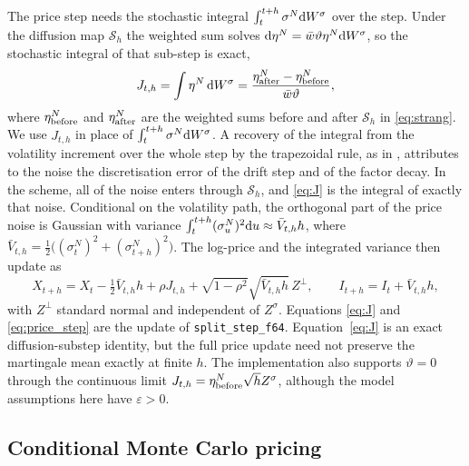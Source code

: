 The price step needs the stochastic integral $\int_t^{t+h}\sigma^N\mathrm{d} W^\sigma$ over the step. Under the diffusion map $\mathcal{S}_h$ the weighted sum solves $\mathrm{d}\eta^N=\bar w\vartheta\eta^N\mathrm{d} W^\sigma$, so the stochastic integral of that sub-step is exact,
\begin{equation}\label{eq:J}
J_{t,h}=\int\eta^N\,\D W^\sigma=\frac{\eta^N_{\rm after}-\eta^N_{\rm before}}{\bar w\vartheta},
\end{equation}
where $\eta^N_{\rm before}$ and $\eta^N_{\rm after}$ are the weighted sums before and after $\mathcal{S}_h$ in \eqref{eq:strang}. We use $J_{t,h}$ in place of $\int_t^{t+h}\sigma^N\mathrm{d} W^\sigma$. A recovery of the integral from the volatility increment over the whole step by the trapezoidal rule, as in \citet{Andersen2007}, attributes to the noise the discretisation error of the drift step and of the factor decay. In the scheme, all of the noise enters through $\mathcal{S}_h$, and \eqref{eq:J} is the integral of exactly that noise. Conditional on the volatility path, the orthogonal part of the price noise is Gaussian with variance $\int_t^{t+h}(\sigma^N_u)^2\mathrm{d} u\approx\bar V_{t,h}h$, where $\bar V_{t,h}=\tfrac12\big((\sigma^N_t)^2+(\sigma^N_{t+h})^2\big)$. The log-price and the integrated variance then update as
\begin{equation}\label{eq:price_step}
X_{t+h}=X_t-\tfrac12\bar V_{t,h}h+\rho J_{t,h}+\sqrt{1-\rho^2}\sqrt{\bar V_{t,h}h}\,Z^\perp,\qquad I_{t+h}=I_t+\bar V_{t,h}h,
\end{equation}
with $Z^\perp$ standard normal and independent of $Z^\sigma$. Equations \eqref{eq:J} and \eqref{eq:price_step} are the update of \texttt{split\_step\_f64}. Equation~\eqref{eq:J} is an exact diffusion-substep identity, but the full price update need not preserve the martingale mean exactly at finite $h$. The implementation also supports $\vartheta=0$ through the continuous limit $J_{t,h}=\eta^N_{\rm before}\sqrt h Z^\sigma$, although the model assumptions here have $\varepsilon>0$.

\subsection{Conditional Monte Carlo pricing}\label{sec:conditional_mc}

